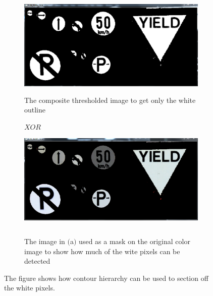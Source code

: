 \documentclass{article}
\begin{document}
\begin{figure}[H]
\begin{subfigure}{0.5\textwidth}
\includegraphics[width=0.9\linewidth, height=5cm]{N_WHT_TRSH3.PNG} 
\caption{The composite thresholded image to get only the white outline}
\label{fig:subim1}
\end{subfigure}
\begin{subfigure}{0.5\textwidth}
$XOR   $
\includegraphics[width=0.9\linewidth, height=5cm]{N_WHITE_CROP3.PNG}
\caption{The image in $($a$)$ used as a mask on the original color image to show how much of the wite pixels can be detected}
\label{fig:subim2}
\end{subfigure}
\caption{The figure shows how contour hierarchy can be used to section off the white pixels.}
\label{fig:image2}
\end{figure}
\end{document}
